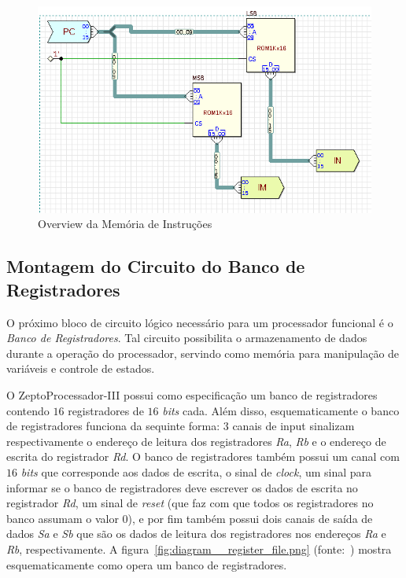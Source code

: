 \documentclass[12pt]{article}
\begin{document}
\begin{figure}[H]
    \centering
    \includegraphics[width=.9\textwidth]{Projeto/images/circuit__ROM_memory.png}
    \caption{Overview da Memória de Instruções}\label{fig:circuit__ROM_memory.png}
\end{figure}

\subsection{Montagem do Circuito do Banco de Registradores}\label{sec:2.3}

O próximo bloco de circuito lógico necessário para um processador funcional é o
\emph{Banco de Registradores}. Tal circuito possibilita o armazenamento de dados
durante a operação do processador, servindo como memória para manipulação de
variáveis e controle de estados.

O ZeptoProcessador-III possui como especificação um banco de registradores
contendo $16$ registradores de $16$ \emph{bits} cada. Além disso,
esquematicamente o banco de registradores funciona da sequinte forma: $3$ canais
de input sinalizam respectivamente o endereço de leitura dos registradores
\emph{Ra}, \emph{Rb} e o endereço de escrita do registrador \emph{Rd}. O banco
de registradores também possui um canal com $16$ \emph{bits} que corresponde aos
dados de escrita, o sinal de \emph{clock}, um sinal para informar se o banco de
registradores deve escrever os dados de escrita no registrador \emph{Rd}, um
sinal de \emph{reset} (que faz com que todos os registradores no banco assumam o
valor $0$), e por fim também possui dois canais de saída de dados \emph{Sa} e
\emph{Sb} que são os dados de leitura dos registradores nos endereços \emph{Ra}
e \emph{Rb}, respectivamente. A figura~\ref{fig:diagram__register_file.png}
(fonte:~\cite{Diagram_Register_file}) mostra esquematicamente como opera um
banco de registradores.
\end{document}
